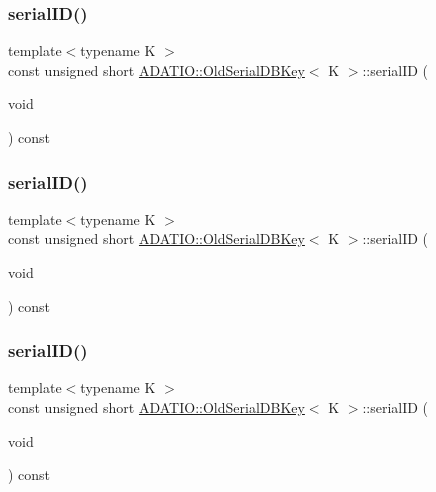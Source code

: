 \subsubsection{\texorpdfstring{serialID()}{serialID()}\hspace{0.1cm}{\footnotesize\ttfamily [1/3]}}
{\footnotesize\ttfamily template$<$typename K $>$ \\
const unsigned short \mbox{\hyperlink{classADATIO_1_1OldSerialDBKey}{A\+D\+A\+T\+I\+O\+::\+Old\+Serial\+D\+B\+Key}}$<$ K $>$\+::serial\+ID (\begin{DoxyParamCaption}\item[{void}]{ }\end{DoxyParamCaption}) const\hspace{0.3cm}{\ttfamily [inline]}}

\mbox{\label{classADATIO_1_1OldSerialDBKey_af45528e61ba59f1978d3492534dffd46}} 
\subsubsection{\texorpdfstring{serialID()}{serialID()}\hspace{0.1cm}{\footnotesize\ttfamily [2/3]}}
{\footnotesize\ttfamily template$<$typename K $>$ \\
const unsigned short \mbox{\hyperlink{classADATIO_1_1OldSerialDBKey}{A\+D\+A\+T\+I\+O\+::\+Old\+Serial\+D\+B\+Key}}$<$ K $>$\+::serial\+ID (\begin{DoxyParamCaption}\item[{void}]{ }\end{DoxyParamCaption}) const\hspace{0.3cm}{\ttfamily [inline]}}

\mbox{\label{classADATIO_1_1OldSerialDBKey_af45528e61ba59f1978d3492534dffd46}} 
\subsubsection{\texorpdfstring{serialID()}{serialID()}\hspace{0.1cm}{\footnotesize\ttfamily [3/3]}}
{\footnotesize\ttfamily template$<$typename K $>$ \\
const unsigned short \mbox{\hyperlink{classADATIO_1_1OldSerialDBKey}{A\+D\+A\+T\+I\+O\+::\+Old\+Serial\+D\+B\+Key}}$<$ K $>$\+::serial\+ID (\begin{DoxyParamCaption}\item[{void}]{ }\end{DoxyParamCaption}) const\hspace{0.3cm}{\ttfamily [inline]}}

